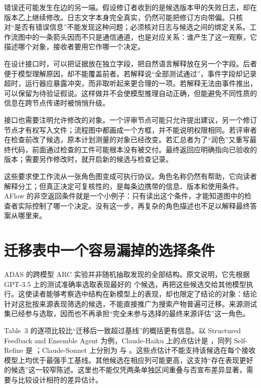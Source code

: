 错误还可能发生在边的另一端。假设修订者收到的是候选版本甲的失败日志，却在版本乙上继续修改。日志文字本身完全真实，仍然可能把修订方向带偏。只核对“是否有错误信息”不能发现这种问题；必须核对日志与候选之间的绑定关系。工作流图中的一条箭头因而不只是通信通道，也是对应关系：谁产生了这一观察，它描述哪个对象，接收者要用它作哪一个决定。

在设计接口时，可以把证据放在独立字段，把自然语言解释放在另一个字段。后者便于模型理解原因，却不能覆盖前者。若解释说“全部测试通过”，事件字段却记录超时，运行器应暴露冲突，而非取听起来更合理的一项。若解释无法由事件推出，可以保留为待验证假说。这样做并不会使模型推理自动正确，但能避免不同性质的信息在跨节点传递时被悄悄升级。

接口也需要注明允许修改的对象。一个评审节点可能只允许提出建议，另一个修订节点才有权写入文件；流程图中都画成一个方框，并不能说明权限相同。若评审者在检查前改了候选，原本计划测量的对象已经改变。若汇总者为了“润色”又重写最终代码，前面通过检查的工件可能根本没有被交付。最终返回应明确指向已验收的版本；需要另作修改时，就开启新的候选与检查记录。

这些要求使工作流从一张角色图变成可执行协议。角色名称仍然有帮助，它向读者解释分工；但真正决定可复核性的，是每条边携带的信息、版本和使用条件。AFlow 的非空返回条件就是一个小例子：只有读出这个条件，才能知道图中的检查者实际控制了哪一个决定\cite{aflow-2410}。没有这一步，再复杂的角色描述也不足以解释最终答案从哪里来。

\section{迁移表中一个容易漏掉的选择条件}
\label{sec:ch09-transferselection}

ADAS 的跨模型 ARC 实验并非随机抽取发现的全部结构。原文说明，它先根据 GPT-3.5 上的测试准确率选取表现最好的  个候选，再把这些候选交给其他模型执行\cite{adas-2408}。这使读者能够考察选中结构在新模型上的表现，却也限定了结论的对象：结论针对这批按来源表现筛选的候选，不能直接推广为搜索产物普遍可迁移。来源测试集已经参与选取，因而也不再承担“完全未参与选择的最终来源评估”这一角色。

Table~3 的逐项比较比“迁移后一致超过基线”的概括更有信息。以 Structured Feedback and Ensemble Agent 为例，Claude-Haiku 上的点估计是 ，同列 Self-Refine 是 ；Claude-Sonnet 上分别为  与 \cite{adas-2408}。这些点估计不能支持该候选在每个接收模型上均优于最强手工基线。其他候选在相应列可能更高，这支持“存在表现更好的候选”这一较窄陈述。这里也不能仅凭两条单独区间重叠与否宣布差异显著，需要与比较设计相符的差异估计。

